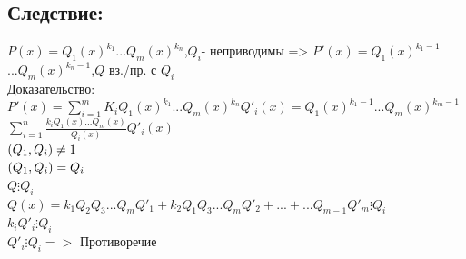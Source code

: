 \documentclass[12pt]{article}
\let\gcd\relax
\DeclareMathOperator{\gcd}{НОД}
\begin{document}
\subsection{Следствие:}
\noindent $P(x)=Q_1(x)^{k_1}$$... Q_m(x)^{k_n}$,$Q_i$- неприводимы => $P'(x)=Q_1(x)^{k_1-1}$$... Q_m(x)^{k_n-1}$,$Q$ вз./пр. с $Q_i$
        \\Доказательство:
        \\$P'(x)=\sum\limits _{i=1}^{m} K_iQ_1(x)^{k_1}$$...Q_m(x)^{k_n}$$Q'_i(x)=Q_1(x)^{k_1-1}$$...Q_m(x)^{k_m-1}$$\sum\limits _{i=1}^{n}\frac{k_iQ_1(x)...Q_m(x)}{Q_i(x)}Q'_i(x)$
    \\$\gcd(Q_1,Q_i)\neq 1$
        \\$\gcd(Q_1,Q_i) = Q_i$
    \\$Q \vdots Q_i$
        \\$Q(x)= k_1Q_2Q_3...Q_mQ'_1+k_2Q_1Q_3...Q_mQ'_2+...+...Q_{m-1}Q'_m\vdots Q_i$
    \\$k_iQ'_i\vdots Q_i$
        \\$Q'_i\vdots Q_i =>$ Противоречие
\end{document}
